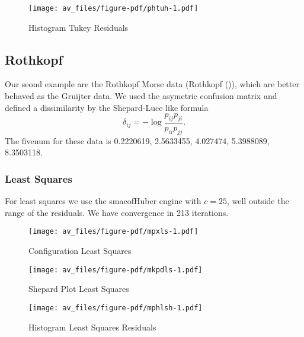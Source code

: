 \documentclass[
  12pt,
  letterpaper,
  DIV=11,
  numbers=noendperiod]{scrartcl}
\theoremstyle{plain}
\theoremstyle{remark}
\begin{document}
\begin{figure}[H]

{\centering \texttt{[image: av\_files/figure-pdf/phtuh-1.pdf]}

}

\caption{Histogram Tukey Residuals}

\end{figure}%

\subsection{Rothkopf}\label{rothkopf}

Our seond example are the Rothkopf Morse data (Rothkopf
()), which are better behaved as the
Gruijter data. We used the asymetric confusion matrix and defined a
dissimilarity by the Shepard-Luce like formula \[
\delta_{ij}=-\log\frac{p_{ij}p_{ji}}{p_{ii}p_{jj}}.
\] The fivenum for these data is 0.2220619, 2.5633455, 4.027474,
5.3988089, 8.3503118.

\subsubsection{Least Squares}\label{least-squares-1}

For least squares we use the smacofHuber engine with \(c=25\), well
outside the range of the residuals. We have convergence in 213
iterations.

\begin{figure}[H]

{\centering \texttt{[image: av\_files/figure-pdf/mpxls-1.pdf]}

}

\caption{Configuration Least Squares}

\end{figure}%

\begin{figure}[H]

{\centering \texttt{[image: av\_files/figure-pdf/mkpdls-1.pdf]}

}

\caption{Shepard Plot Least Squares}

\end{figure}%

\begin{figure}[H]

{\centering \texttt{[image: av\_files/figure-pdf/mphlsh-1.pdf]}

}

\caption{Histogram Least Squares Residuals}

\end{figure}%
\end{document}
